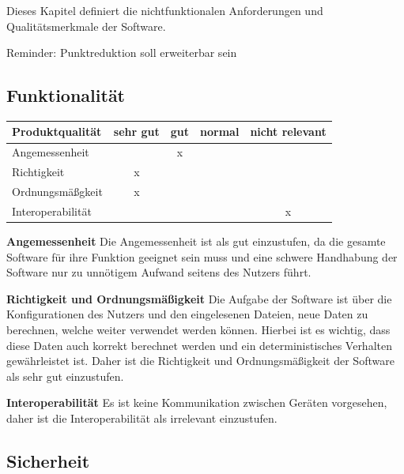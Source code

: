\documentclass[parskip=full]{scrartcl} %
\begin{document}
Dieses Kapitel definiert die nichtfunktionalen Anforderungen und Qualitätsmerkmale der Software.

Reminder: Punktreduktion soll erweiterbar sein



\subsection{Funktionalität}

\begin{tabular}{|l| c| c| c| c|}
    \hline
        Produktqualität & sehr gut & gut & normal & nicht relevant \\
    \hline
        Angemessenheit & & x & &\\
    \hline
        Richtigkeit & x & & &\\
    \hline
        Ordnungsmäßgkeit & x & & &\\
    \hline
        Interoperabilität & & & & x\\
    \hline
        
    \end{tabular}

\textbf{Angemessenheit}
\newline
Die Angemessenheit ist als gut einzustufen, da die gesamte Software für ihre Funktion geeignet sein muss und eine schwere Handhabung der Software nur zu unnötigem Aufwand seitens des Nutzers führt.



\textbf{Richtigkeit und Ordnungsmäßigkeit}
\newline
Die Aufgabe der Software ist über die Konfigurationen des Nutzers und den eingelesenen Dateien, neue Daten zu berechnen, welche weiter verwendet werden können. Hierbei ist es wichtig, dass diese Daten auch korrekt berechnet werden und ein deterministisches Verhalten gewährleistet ist.
Daher ist die Richtigkeit und Ordnungsmäßigkeit der Software als sehr gut einzustufen.

\textbf{Interoperabilität}
\newline
Es ist keine Kommunikation zwischen Geräten vorgesehen, daher ist die Interoperabilität als irrelevant einzustufen.


\newpage 

\subsection{Sicherheit}
\end{document}
